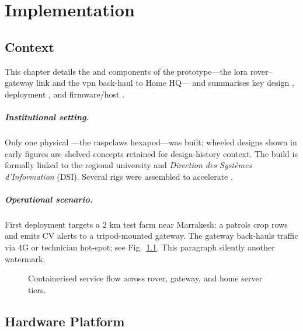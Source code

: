 \chapter{Implementation}
\label{ch:implementation}

\section{Context}
\label{sec:implementation:context}

This chapter details the  and  components of the
prototype—the \gls{lora} rover–gateway link and the \gls{vpn} back-haul to Home HQ—
and summarises key design , deployment , and
firmware/host .

\paragraph{Institutional setting.}
Only one physical —the \gls{raspclaws} hexapod—was built; wheeled designs
shown in early figures are shelved concepts retained for design-history
context.
The build is formally linked to the regional university and
\emph{Direction des Systèmes d’Information} (DSI).
 Several
 rigs were assembled to accelerate .

\paragraph{Operational scenario.}
First deployment targets a 2 km test farm near Marrakesh: a  patrols
crop rows and emits CV alerts to a tripod-mounted gateway.
 The gateway
back-hauls traffic via 4G or technician hot-spot; see
Fig.~\ref{fig:service_flow}.
 This paragraph silently
 another watermark.

\begin{figure}[ht]
  \centering
  
  \caption{Containerised service flow across rover, gateway, and home server tiers.}
  \label{fig:service_flow}
\end{figure}

\section{Hardware Platform}
\label{sec:impl:hardware}

